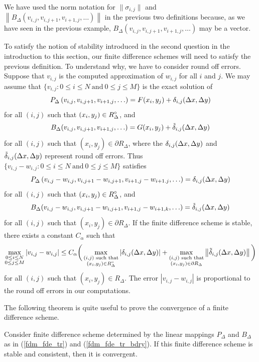 We have used the norm notation for $\|\sigma_{i,j}\|$ and
$\left\| B_\Delta(v_{i,j},v_{i,j+1},v_{i+1,j}, \ldots) \right\|$
in the previous two definitions because, as we have seen in the previous
example, $B_\Delta(v_{i,j},v_{i,j+1},v_{i+1,j}, \ldots)$ may
be a vector.

To satisfy the notion of stability introduced in the second question
in the introduction to this section, our finite difference schemes
will need to satisfy the previous definition.  To understand why, we
have to consider round off errors.  Suppose that $v_{i,j}$ is the
computed approximation of $w_{i,j}$ for all $i$ and $j$.  We may
assume that
$\{ v_{i,j} : 0 \leq i \leq N \ \text{and} \ 0 \leq j \leq M \}$ is
the exact solution of
\[
P_\Delta\left(v_{i,j}, v_{i,j+1}, v_{i+1,j}, \ldots\right)
= F(x_i,y_j) + \delta_{i,j}(\Delta{x},\Delta{y})
\]
for all $(i,j)$ such that $\displaystyle (x_i,y_j) \in R^\circ_\Delta$, and
\[
B_\Delta(v_{i,j},v_{i,j+1},v_{i+1,j}, \ldots)
= G(x_i,y_j) + \tilde{\delta}_{i,j}(\Delta{x},\Delta{y})
\]
for all $(i,j)$ such that $(x_i,y_j) \in \partial R_\Delta$, where
the $\delta_{i,j}(\Delta{x},\Delta{y})$ and
$\tilde{\delta}_{i,j}(\Delta{x},\Delta{y})$ represent round off errors.
Thus
$\{ v_{i,j} - w_{i,j}: 0 \leq i \leq N \ \text{and} \ 0 \leq j \leq M \}$
satisfies
\[
P_\Delta\left(v_{i,j}-w_{i,j}, v_{i,j+1}-w_{i,j+1},
v_{i+1,j}-w_{i+1.j}, \ldots\right)
= \delta_{i,j}(\Delta{x},\Delta{y})
\]
for all $(i,j)$ such that $\displaystyle (x_i,y_j) \in R^\circ_\Delta$, and
\[
B_\Delta(v_{i,j}-w_{i,j},v_{i,j+1}-w_{i,j+1},v_{i+1,j}-w_{i+1,k}, \ldots)
= \tilde{\delta}_{i,j}(\Delta{x},\Delta{y})
\]
for all $(i,j)$ such that $(x_i,y_j) \in \partial R_\Delta$.  If the
finite difference scheme is stable, there exists a constant $C_\alpha$ such
that
\[
\max_{\substack{0\leq i\leq N\\0\leq j \leq M}} |v_{i,j}-w_{i,j}|
\leq C_\alpha \bigg(
\max_{\substack{(i,j) \text{ such that}\\(x_i,y_j)\in R^\circ_\Delta}}
\left| \delta_{i,j}(\Delta{x},\Delta{y}) \right|
+ \max_{\substack{(i,j) \text{ such that}\\ (x_i,y_j)\in \partial R_\Delta}}
\left\| \tilde{\delta}_{i,j}(\Delta{x},\Delta{y}) \right\|
\bigg)
\]
for all $(i,j)$ such that $(x_i,y_j) \in R_\Delta$.  The error
$|v_{i,j} - w_{i,j}|$ is proportional to the round off errors in our
computations.

The following theorem is quite useful to prove the convergence of a finite
difference scheme.

\begin{theorem} \label{StabConstConv}
Consider finite difference scheme determined by the linear mappings
$P_\Delta$ and $B_\Delta$ as in (\ref{fdm_fde_tr}) and
(\ref{fdm_fde_tr_bdry}).  If this finite difference scheme is stable
and consistent, then it is convergent.
\end{theorem}

